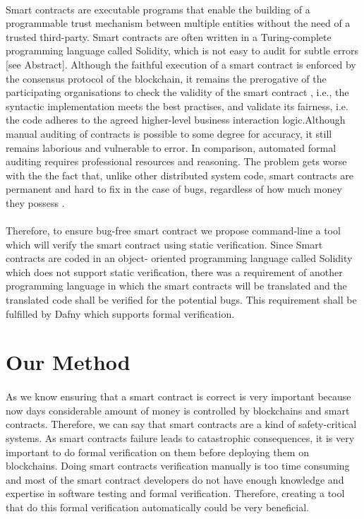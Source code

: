 \documentclass[11pt]{article}
\begin{document}
\paragraph{}
Smart contracts are executable programs that enable
the building of a programmable trust mechanism between
multiple entities without the need of a trusted third-party. Smart contracts are often written in a Turing-complete programming language called Solidity, which is not easy to audit for subtle errors [see Abstract]\cite{Hardaker2004}. Although the faithful execution of a smart contract is enforced by the consensus protocol of the blockchain, it remains the prerogative of the participating organisations to check the validity of the smart contract , i.e., the syntactic implementation meets the best practises, and validate its fairness, i.e. the code adheres to the agreed higher-level business interaction logic.Although manual auditing of contracts is possible to some degree for accuracy, it still remains laborious and vulnerable to error. In comparison, automated formal auditing requires professional resources and reasoning. The problem gets worse with the the fact that, unlike other distributed system code, smart contracts are permanent and hard to fix in the case of bugs, regardless of how much money they possess \cite{kalra2018zeus}.

\paragraph{}
Therefore, to ensure bug-free smart contract we propose command-line a tool which will verify the smart contract using static verification. Since Smart contracts are coded in an object- oriented programming language called Solidity which does not support static verification, there was a requirement of another programming language in which the smart contracts will be translated and the translated code shall be verified for the potential bugs. This requirement shall be fulfilled by Dafny which supports formal verification.

\section{Our Method}
\paragraph{}
As we know ensuring that a smart contract is correct is very important because now days considerable amount of money is controlled by blockchains and smart contracts. Therefore, we can say that smart contracts are a kind of safety-critical systems. As smart contracts failure leads to catastrophic consequences, it is very important to do formal verification on them before deploying them on blockchains. Doing smart contracts verification manually is too time consuming and most of the smart contract developers do not have enough knowledge and expertise in software testing and formal verification. Therefore, creating a tool that do this formal verification automatically could be very beneficial. 
\end{document}
